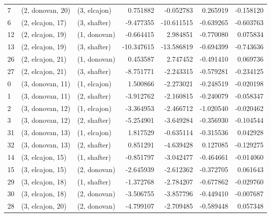 \begin{tabular}{lllrrrr}
7  &  (2, donovan, 20) &     (3, elcajon) &   0.751882 &  -0.052783 &   0.265919 & -0.158120 \\
6  &  (2, elcajon, 17) &     (3, shafter) &  -9.477355 & -10.611515 &  -0.639265 & -0.603763 \\
12 &  (2, elcajon, 19) &     (1, donovan) &  -0.664415 &   2.984851 &  -0.770080 &  0.075834 \\
13 &  (2, elcajon, 19) &     (3, shafter) & -10.347615 & -13.586819 &  -0.694399 & -0.743636 \\
26 &  (2, elcajon, 21) &     (1, donovan) &   0.453587 &   2.747452 &  -0.491410 &  0.069736 \\
27 &  (2, elcajon, 21) &     (3, shafter) &  -8.751771 &  -2.243315 &  -0.579281 & -0.234125 \\
0  &  (3, donovan, 11) &     (1, elcajon) &   1.500866 &  -2.273021 &  -0.248519 & -0.020198 \\
1  &  (3, donovan, 11) &     (2, shafter) &  -3.912762 &  -2.160815 &  -0.240079 & -0.058347 \\
2  &  (3, donovan, 12) &     (1, elcajon) &  -3.364953 &  -2.466712 &  -1.020540 & -0.020462 \\
3  &  (3, donovan, 12) &     (2, shafter) &  -5.254901 &  -3.649284 &  -0.356930 & -0.104544 \\
31 &  (3, donovan, 13) &     (1, elcajon) &   1.817529 &  -0.635114 &  -0.315536 &  0.042928 \\
32 &  (3, donovan, 13) &     (2, shafter) &   0.851291 &  -4.639428 &   0.127085 & -0.129275 \\
14 &  (3, elcajon, 15) &     (1, shafter) &  -0.851797 &  -3.042477 &  -0.464661 & -0.014060 \\
15 &  (3, elcajon, 15) &     (2, donovan) &  -2.645939 &  -2.612362 &  -0.372705 &  0.061643 \\
29 &  (3, elcajon, 18) &     (1, shafter) &  -1.372768 &  -2.784207 &  -0.677862 & -0.029760 \\
30 &  (3, elcajon, 18) &     (2, donovan) &  -3.506755 &  -3.857796 &  -0.449410 & -0.007687 \\
28 &  (3, elcajon, 20) &     (2, donovan) &  -4.799107 &  -2.709485 &  -0.589448 &  0.057348 \\
\bottomrule
\end{tabular}
